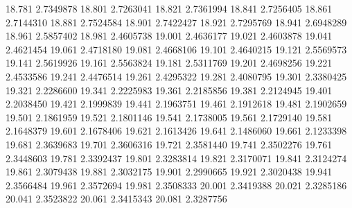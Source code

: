 18.781 2.7349878
18.801 2.7263041
18.821 2.7361994
18.841 2.7256405
18.861 2.7144310
18.881 2.7524584
18.901 2.7422427
18.921 2.7295769
18.941 2.6948289
18.961 2.5857402
18.981 2.4605738
19.001 2.4636177
19.021 2.4603878
19.041 2.4621454
19.061 2.4718180
19.081 2.4668106
19.101 2.4640215
19.121 2.5569573
19.141 2.5619926
19.161 2.5563824
19.181 2.5311769
19.201 2.4698256
19.221 2.4533586
19.241 2.4476514
19.261 2.4295322
19.281 2.4080795
19.301 2.3380425
19.321 2.2286600
19.341 2.2225983
19.361 2.2185856
19.381 2.2124945
19.401 2.2038450
19.421 2.1999839
19.441 2.1963751
19.461 2.1912618
19.481 2.1902659
19.501 2.1861959
19.521 2.1801146
19.541 2.1738005
19.561 2.1729140
19.581 2.1648379
19.601 2.1678406
19.621 2.1613426
19.641 2.1486060
19.661 2.1233398
19.681 2.3639683
19.701 2.3606316
19.721 2.3581440
19.741 2.3502276
19.761 2.3448603
19.781 2.3392437
19.801 2.3283814
19.821 2.3170071
19.841 2.3124274
19.861 2.3079438
19.881 2.3032175
19.901 2.2990665
19.921 2.3020438
19.941 2.3566484
19.961 2.3572694
19.981 2.3508333
20.001 2.3419388
20.021 2.3285186
20.041 2.3523822
20.061 2.3415343
20.081 2.3287756
